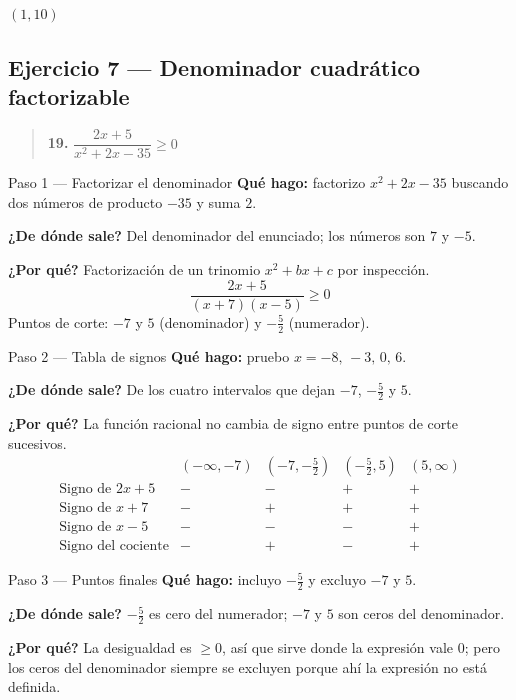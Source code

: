 \documentclass[11pt]{article}
\begin{document}
\begin{resp}
$(1,10)$
\end{resp}

\subsection*{Ejercicio 7 — Denominador cuadrático factorizable}

\begin{quote}
\textbf{19.} $\dfrac{2x+5}{x^2+2x-35}\ge 0$
\end{quote}

\begin{paso}{Paso 1 --- Factorizar el denominador}
\textbf{Qué hago:} factorizo $x^2+2x-35$ buscando dos números de producto $-35$ y suma $2$.

\textbf{¿De dónde sale?} Del denominador del enunciado; los números son $7$ y $-5$.

\textbf{¿Por qué?} Factorización de un trinomio $x^2+bx+c$ por inspección.
\[
\frac{2x+5}{(x+7)(x-5)}\ge 0
\]
Puntos de corte: $-7$ y $5$ (denominador) y $-\frac52$ (numerador).
\end{paso}

\begin{paso}{Paso 2 --- Tabla de signos}
\textbf{Qué hago:} pruebo $x=-8,\,-3,\,0,\,6$.

\textbf{¿De dónde sale?} De los cuatro intervalos que dejan $-7$, $-\frac52$ y $5$.

\textbf{¿Por qué?} La función racional no cambia de signo entre puntos de corte sucesivos.
\[
\begin{array}{l|cccc}
 & (-\infty,-7) & (-7,-\tfrac52) & (-\tfrac52,5) & (5,\infty)\\\hline
\text{Signo de } 2x+5 & - & - & + & +\\
\text{Signo de } x+7 & - & + & + & +\\
\text{Signo de } x-5 & - & - & - & +\\\hline
\text{Signo del cociente} & - & + & - & +
\end{array}
\]
\end{paso}

\begin{paso}{Paso 3 --- Puntos finales}
\textbf{Qué hago:} incluyo $-\frac52$ y excluyo $-7$ y $5$.

\textbf{¿De dónde sale?} $-\frac52$ es cero del numerador; $-7$ y $5$ son ceros del denominador.

\textbf{¿Por qué?} La desigualdad es $\ge 0$, así que sirve donde la expresión vale $0$; pero los ceros del denominador siempre se excluyen porque ahí la expresión no está definida.
\end{paso}
\end{document}
